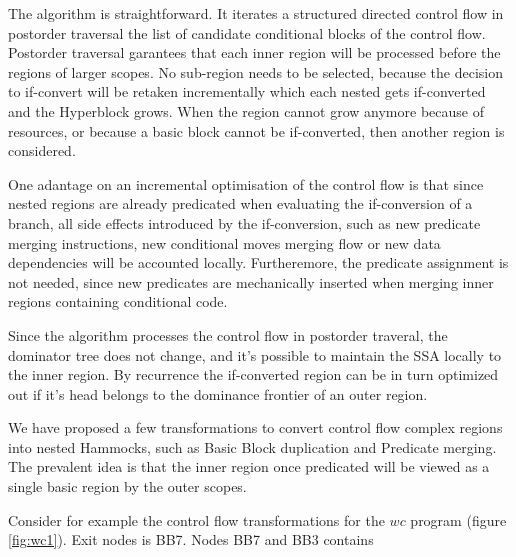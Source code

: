 The algorithm is straightforward. It iterates a structured directed control flow in postorder traversal the list of candidate conditional blocks of the control flow. Postorder traversal garantees that each inner region will be processed before the regions of larger scopes. No sub-region needs to be selected, because the decision to if-convert will be retaken incrementally which each nested gets if-converted and the Hyperblock grows. When the region cannot grow anymore because of resources, or because a basic block cannot be if-converted, then another region is considered.

One adantage on an incremental optimisation of the control flow is that since nested regions are already predicated when evaluating the if-conversion of a branch, all side effects introduced by the if-conversion, such as new predicate merging instructions, new conditional moves merging flow or new data dependencies will be accounted locally. Furtheremore, the predicate assignment is not needed, since new predicates are mechanically inserted when merging inner regions containing conditional code.

Since the algorithm processes the control flow in postorder traveral, the dominator tree does not change, and it's possible to maintain the SSA locally to the inner region. By recurrence the if-converted region can be in turn optimized out if it's head belongs to the dominance frontier of an outer region.

We have proposed a few transformations to convert control flow complex regions into nested Hammocks, such as Basic Block duplication and Predicate merging. The prevalent idea is that the inner region once predicated will be viewed as a single basic region by the outer scopes.

Consider for example the control flow transformations for the $wc$ program (figure \ref{fig:wc1}). Exit nodes is BB7. Nodes BB7 and BB3 contains 

